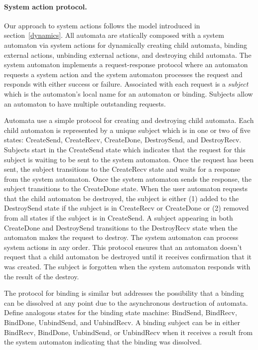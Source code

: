 \paragraph{System action protocol.}
Our approach to system actions follows the model introduced in section~\ref{dynamics}.
All automata are statically composed with a system automaton via system actions for dynamically creating child automata, binding external actions, unbinding external actions, and destroying child automata.
The system automaton implements a request-response protocol where an automaton requests a system action and the system automaton processes the request and responds with either success or failure.
Associated with each request is a \emph{subject} which is the automaton's local name for an automaton or binding.
Subjects allow an automaton to have multiple outstanding requests.

Automata use a simple protocol for creating and destroying child automata.
Each child automaton is represented by a unique subject which is in one or two of five states: CreateSend, CreateRecv, CreateDone, DestroySend, and DestroyRecv.
Subjects start in the CreateSend state which indicates that the request for this subject is waiting to be sent to the system automaton.
Once the request has been sent, the subject transitions to the CreateRecv state and waits for a response from the system automaton.
Once the system automaton sends the response, the subject transitions to the CreateDone state.
When the user automaton requests that the child automaton be destroyed, the subject is either (1) added to the DestroySend state if the subject is in CreateRecv or CreateDone or (2) removed from all states if the subject is in CreateSend.
A subject appearing in both CreateDone and DestroySend transitions to the DestroyRecv state when the automaton makes the request to destroy.
The system automaton can process system actions in any order.
This protocol ensures that an automaton doesn't request that a child automaton be destroyed until it receives confirmation that it was created.
The subject is forgotten when the system automaton responds with the result of the destroy.

The protocol for binding is similar but addresses the possibility that a binding can be dissolved at any point due to the asynchronous destruction of automata.
Define analogous states for the binding state machine: BindSend, BindRecv, BindDone, UnbindSend, and UnbindRecv.
A binding subject can be in either BindRecv, BindDone, UnbindSend, or UnbindRecv when it receives a result from the system automaton indicating that the binding was dissolved.

